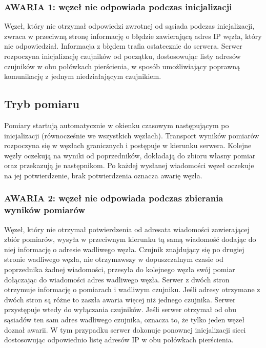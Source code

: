 \documentclass[a4paper,11pt]{article}
\begin{document}
\subsubsection{AWARIA 1: węzeł nie odpowiada podczas inicjalizacji}
Węzeł, który nie otrzymał odpowiedzi zwrotnej od sąsiada podczas inicjalizacji,
zwraca w przeciwną stronę informację o błędzie zawierającą adres IP węzła, który nie odpowiedział.
Informacja z błędem trafia ostatecznie do serwera.
Serwer rozpoczyna inicjalizację czujników od początku,
dostosowując listy adresów czujników w obu połówkach pierścienia,
w sposób umożliwiający poprawną komunikację z jednym niedziałającym czujnikiem.

\subsection{Tryb pomiaru}
Pomiary startują automatycznie w okienku czasowym następującym po inicjalizacji
(równocześnie we wszystkich węzłach).
Transport wyników pomiarów rozpoczyna się w węzłach granicznych i postępuje w kierunku serwera.
Kolejne węzły oczekują na wyniki od poprzedników,
dokładają do zbioru własny pomiar oraz przekazują je następnikom.
Po każdej wysłanej wiadomości węzeł oczekuje na jej potwierdzenie,
brak potwierdzenia oznacza awarię węzła.

\subsubsection{AWARIA 2: węzeł nie odpowiada podczas zbierania wyników pomiarów}
Węzeł, który nie otrzymał potwierdzenia od adresata wiadomości zawierającej zbiór pomiarów,
wysyła w przeciwnym kierunku tą samą wiadomość dodając do niej informację o adresie wadliwego węzła.
Czujnik znajdujący się po drugiej stronie wadliwego węzła,
nie otrzymawszy w dopuszczalnym czasie od poprzednika żadnej wiadomości,
przesyła do kolejnego węzła swój pomiar dołączając do wiadomości adres wadliwego węzła.
Serwer z dwóch stron otrzymuje informację o pomiarach i wadliwym czujniku.
Jeśli adresy otrzymane z dwóch stron są różne to zaszła awaria więcej niż jednego czujnika.
Serwer przystępuje wtedy do wyłączania czujników. Jeśli serwer otrzymał od obu sąsiadów
ten sam adres wadliwego czujnika, oznacza to, że tylko jeden węzeł doznał awarii.
W tym przypadku serwer dokonuje ponownej inicjalizacji sieci dostosowując odpowiednio listę
adresów IP w obu połówkach pierścienia.
\end{document}
